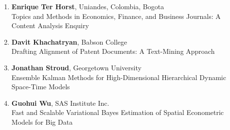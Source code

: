 \begin{enumerate}
\item \textbf{Enrique Ter Horst}, Uniandes, Colombia, Bogota \\
Topics and Methods in Economics, Finance, and Business Journals: A Content Analysis Enquiry
\item \textbf{Davit Khachatryan}, Babson College \\
Drafting Alignment of Patent Documents: A Text-Mining Approach
\item \textbf{Jonathan Stroud}, Georgetown University \\
Ensemble Kalman Methods for High-Dimensional Hierarchical Dynamic Space-Time Models
\item \textbf{Guohui Wu}, SAS Institute Inc. \\
Fast and Scalable Variational Bayes Estimation of Spatial Econometric Models for Big Data
\end{enumerate}

